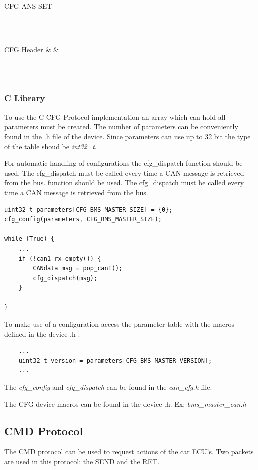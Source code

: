 \documentclass[11pt, a4paper]{article}
\begin{document}
{CFG ANS SET
\\\\
\begin{bytefield}[bitwidth=2.2em]{16}
	 \\
	\begin{rightwordgroup}{CFG Header}
		 &  & 
	\end{rightwordgroup} \\
	 \\
\end{bytefield}


\subsubsection{C Library}
To use the C CFG Protocol implementation an array which can hold all parameters must be created. The number of parameters can be conveniently found in the .h file of the device. Since parameters can use up to 32 bit the type of the table shoud be \textit{int32\_t}.

For automatic handling of configurations the cfg\_dispatch function should be used. The cfg\_dispatch must be called every time a CAN message is retrieved from the bus.  function should be used. The cfg\_dispatch must be called every time a CAN message is retrieved from the bus. 

\begin{verbatim}
uint32_t parameters[CFG_BMS_MASTER_SIZE] = {0};
cfg_config(parameters, CFG_BMS_MASTER_SIZE);

while (True) {
	...
	if (!can1_rx_empty()) {
		CANdata msg = pop_can1();
		cfg_dispatch(msg);
	}

}
\end{verbatim}

To make use of a configuration access the parameter table with the macros defined in the device .h .

\begin{verbatim}
	...
	uint32_t version = parameters[CFG_BMS_MASTER_VERSION];
	...
\end{verbatim}

The \textit{cfg\_config} and \textit{cfg\_dispatch} can be found in the \textit{can\_cfg.h} file.

The CFG device macros can be found in the device .h. Ex: \textit{bms\_master\_can.h}

\subsection{CMD Protocol}
The CMD protocol can be used to request actions of the car ECU's. Two packets are used in this protocol: the SEND and the RET.

}
\end{document}
